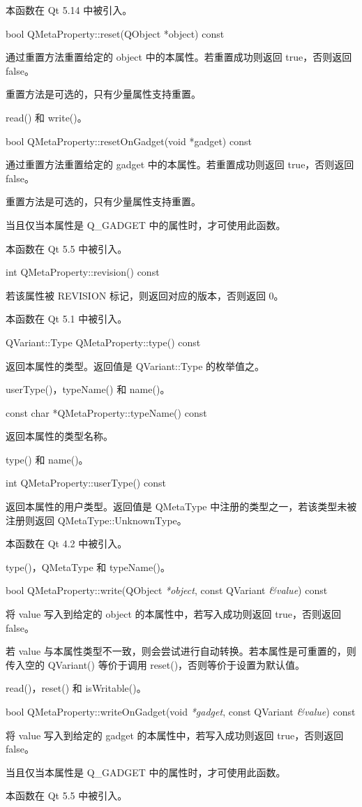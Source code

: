 本函数在 Qt 5.14 中被引入。

bool QMetaProperty::reset(QObject *object) const

通过重置方法重置给定的 object 中的本属性。若重置成功则返回 true，否则返回 false。

重置方法是可选的，只有少量属性支持重置。

\begin{seeAlso}
read() 和 write()。
\end{seeAlso}

bool QMetaProperty::resetOnGadget(void *gadget) const

通过重置方法重置给定的 gadget 中的本属性。若重置成功则返回 true，否则返回 false。

重置方法是可选的，只有少量属性支持重置。

当且仅当本属性是 Q\_GADGET 中的属性时，才可使用此函数。

本函数在 Qt 5.5 中被引入。

int QMetaProperty::revision() const

若该属性被 REVISION 标记，则返回对应的版本，否则返回 0。

本函数在 Qt 5.1 中被引入。

QVariant::Type QMetaProperty::type() const

返回本属性的类型。返回值是 QVariant::Type 的枚举值之。

\begin{seeAlso}
userType()，typeName() 和 name()。
\end{seeAlso}

const char *QMetaProperty::typeName() const

返回本属性的类型名称。

\begin{seeAlso}
type() 和 name()。
\end{seeAlso}

int QMetaProperty::userType() const

返回本属性的用户类型。返回值是 QMetaType 中注册的类型之一，若该类型未被注册则返回 QMetaType::UnknownType。

本函数在 Qt 4.2 中被引入。

\begin{seeAlso}
type()，QMetaType 和 typeName()。
\end{seeAlso}

bool QMetaProperty::write(QObject \emph{*object}, const QVariant \emph{\&value}) const

将 value 写入到给定的 object 的本属性中，若写入成功则返回 true，否则返回 false。

若 value 与本属性类型不一致，则会尝试进行自动转换。若本属性是可重置的，则传入空的 QVariant() 等价于调用 reset()，否则等价于设置为默认值。

\begin{seeAlso}
read()，reset() 和 isWritable()。
\end{seeAlso}

bool QMetaProperty::writeOnGadget(void \emph{*gadget}, const QVariant \emph{\&value}) const

将 value 写入到给定的 gadget 的本属性中，若写入成功则返回 true，否则返回 false。

当且仅当本属性是 Q\_GADGET 中的属性时，才可使用此函数。

本函数在 Qt 5.5 中被引入。